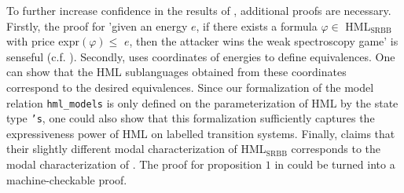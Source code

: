 To further increase confidence in the results of \cite{bj2024silentStepSpectroscopyExpress}, additional proofs are necessary. Firstly, the proof for 'given an energy $e$, if there exists a formula $\varphi \in$ HML$_\text{SRBB}$ with price expr$(\varphi) \leq$ $e$, then the attacker wins the weak spectroscopy game' is senseful (c.f. \cite[lemma $1$]{bj2024silentStepSpectroscopyExpress}).
Secondly, \cite{bj2024silentStepSpectroscopyExpress} uses coordinates of energies to define equivalences. One can show that the HML sublanguages obtained from these coordinates correspond to the desired equivalences.
Since our formalization of the model relation \texttt{hml\_models} is only defined on the parameterization of HML by the state type \texttt{'s}, one could also show that this formalization sufficiently captures the expressiveness power of HML on labelled transition systems.
Finally, \cite[proposition 1]{bj2024silentStepSpectroscopyExpress} claims that their slightly different modal characterization of HML$_\text{SRBB}$ corresponds to the modal characterization of \cite{FOKKINK2019104435}. 
The proof for proposition $1$ in \cite{bj2024silentStepSpectroscopyExpress} could be turned into a machine-checkable proof. 